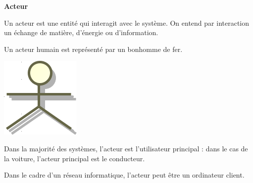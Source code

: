 \documentclass[11pt,oneside]{article}
\begin{document}
\begin{defi}
\textbf{Acteur}

\begin{minipage}[c]{.8\textwidth}
Un acteur est une entité qui interagit avec le système. On entend par interaction un échange de matière, d'énergie ou d'information. 

Un acteur humain est représenté par un bonhomme de fer.
\end{minipage}\hfill
\begin{minipage}[c]{.15\textwidth}
\begin{center}
\includegraphics[width=.5\textwidth]{png/utilisateur}
\end{center}
\end{minipage}
\end{defi}


\begin{exemple}
Dans la majorité des systèmes, l'acteur est l'utilisateur principal : dans le cas de la voiture, l'acteur principal est le conducteur. 

Dans le cadre d'un réseau informatique, l'acteur peut être un ordinateur client. 
\end{exemple}
\end{document}
